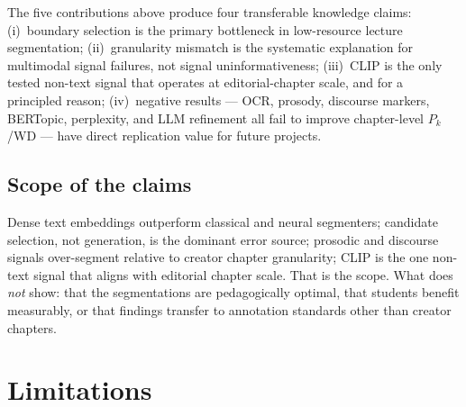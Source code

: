 The five contributions above produce four transferable knowledge claims:
(i)~boundary selection is the primary bottleneck in low-resource lecture
segmentation;
(ii)~granularity mismatch is the systematic explanation for multimodal signal
failures, not signal uninformativeness;
(iii)~CLIP is the only tested non-text signal that operates at editorial-chapter
scale, and for a principled reason;
(iv)~negative results --- OCR, prosody, discourse markers, BERTopic, perplexity,
and LLM refinement all fail to improve chapter-level $P_k$/WD --- have direct
replication value for future projects.

\subsection*{Scope of the claims}

Dense text embeddings outperform classical and neural segmenters; candidate
selection, not generation, is the dominant error source; prosodic and discourse
signals over-segment relative to creator chapter granularity; CLIP is the one
non-text signal that aligns with editorial chapter scale.
That is the scope. What \dataset{} does \emph{not} show: that the segmentations
are pedagogically optimal, that students benefit measurably, or that findings
transfer to annotation standards other than creator chapters.

\section{Limitations}

